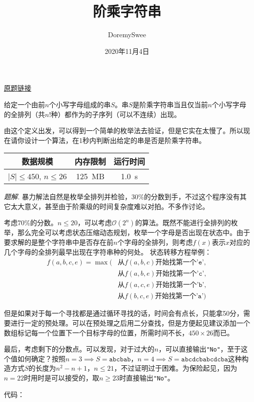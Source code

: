 \documentclass[UTF8,12pt]{ctexart}
\title{阶乘字符串}
\author{DoremySwee}
\date{2020年11月4日}
\begin{document}
\maketitle
\begin{mdframed}[style=Question]
    \underline{\href{https://www.luogu.com.cn/problem/P3989}{原题链接}}

    给定一个由前$n$个小写字母组成的串$S$。串$S$是阶乘字符串当且仅当前$n$个小写字母的全排列（共$n!$种）都作为的子序列（可以不连续）出现。
    
    由这个定义出发，可以得到一个简单的枚举法去验证，但是它实在太慢了。所以现在请你设计一个算法，在1秒内判断出给定的串是否是阶乘字符串。

    \begin{table}[H]
        \centering
        \begin{tabular}{|c|c|c|}\hline
            数据规模&内存限制&运行时间\\\hline
            $|S|\le 450$, $n\le 26$&\SI{125}{MB}&\SI{1.0}{s}\\\hline
        \end{tabular}
    \end{table}
\end{mdframed}
\textit{题解.} 暴力解法自然是枚举全排列并检验，30\%的分数到手，不过这个程序没有其它太大意义，甚至由于阶乘级的时间复杂度难以对拍。不多作讨论。

考虑70\%的分数。$n\le 20$，可以考虑$\mathcal{O}(2^n)$的算法。既然不能进行全排列的枚举，那么完全可以考虑状态压缩动态规划，枚举一个字母是否出现在状态中。由于要求解的是整个字符串中是否存在前$n$个字母的全排列，则考虑$f(x)$表示$x$对应的几个字母的全排列最早出现在字符串种的何处。
状态转移方程举例：
\begin{equation*}
    \begin{aligned}
        f(a,b,c,e)=\max(&从f(a,b,c)开始找第一个\texttt{'e'}, \\
        &从f(a,b,e)开始找第一个\texttt{'c'}, \\
        &从f(a,c,e)开始找第一个\texttt{'b'}, \\
        &从f(b,c,e)开始找第一个\texttt{'a'})
    \end{aligned}
\end{equation*}

但是如果对于每一个寻找都是通过循环寻找的话，时间会有点长，只能拿50分，需要进行一定的预处理。可以在预处理之后用二分查找，但是方便起见建议添加一个数组标记每一个位置下一个目标字母的位置，所需时间不长，$450\times 26$而已。

最后，考虑剩下的分数点。可以发现，对于过大的$n$，可以直接输出\texttt{"No"}，至于这个值如何确定？按照$n=3\implies S=\mathtt{abcbab}$，$n=4\implies S=\mathtt{abcdcbabcdcba}$这种构造方式$S$的长度为$n^2-n+1$，$n\le 21$，不过证明过于困难。为保险起见，因为$n=22$时用时是可以接受的，取$n\ge 23$时直接输出\texttt{"No"}。

代码：


\end{document}
